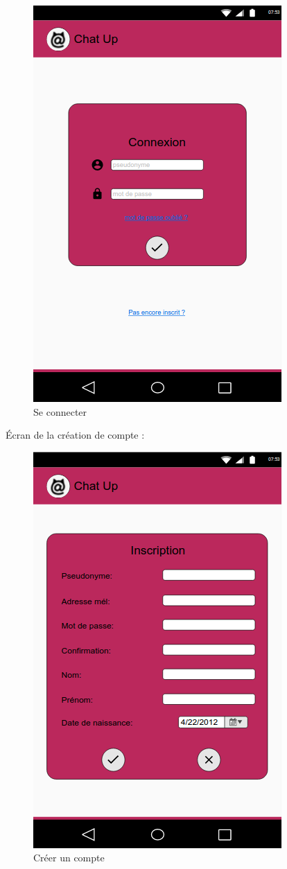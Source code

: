 	\begin{figure}[H]
		\centering \includegraphics[scale=0.5]{img/SeConnecter.png}
		\caption{Se connecter}
	\end{figure}


Écran de la création de compte :	

	\begin{figure}[H]
		\centering \includegraphics[scale=0.5]{img/CreerUnCompte.png}
		\caption{Créer un compte}
	\end{figure}

